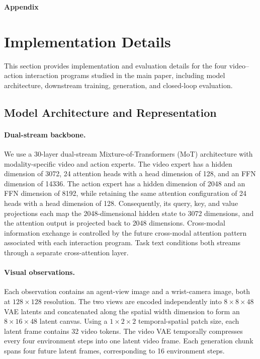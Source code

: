 \clearpage
\setcounter{page}{1}

\clearpage

\appendix

\begin{center}
    \Large\bfseries Appendix
\end{center}
\vspace{1em}

\section{Implementation Details}
\label{sec:supp-impl}

This section provides implementation and evaluation details for the four video--action interaction programs studied in the main paper, including model architecture, downstream training, generation, and closed-loop evaluation.

\subsection{Model Architecture and Representation}
\label{sec:supp-architecture}

\paragraph{Dual-stream backbone.}
We use a 30-layer dual-stream Mixture-of-Transformers (MoT) architecture with modality-specific video and action experts.
The video expert has a hidden dimension of 3072, 24 attention heads with a head dimension of 128, and an FFN dimension of 14336. The action expert has a hidden dimension of 2048 and an FFN dimension of 8192, while retaining the same attention configuration of 24 heads with a head dimension of 128. Consequently, its query, key, and value projections each map the 2048-dimensional hidden state to 3072 dimensions, and the attention output is projected back to 2048 dimensions. 
Cross-modal information exchange is controlled by the future cross-modal attention pattern associated with each interaction program.
Task text conditions both streams through a separate cross-attention layer.

\paragraph{Visual observations.}
Each observation contains an agent-view image and a wrist-camera
image, both at $128\times128$ resolution. 
The two views are encoded independently into \(8\times8\times48\) VAE latents and concatenated along the spatial width dimension to form an \(8\times16\times48\) latent canvas.
Using a \(1\times2\times2\) temporal-spatial patch size, each latent frame contains 32 video tokens.
The video VAE temporally compresses every four environment steps into one latent video frame. Each generation chunk spans four future latent frames, corresponding to 16 environment steps.

